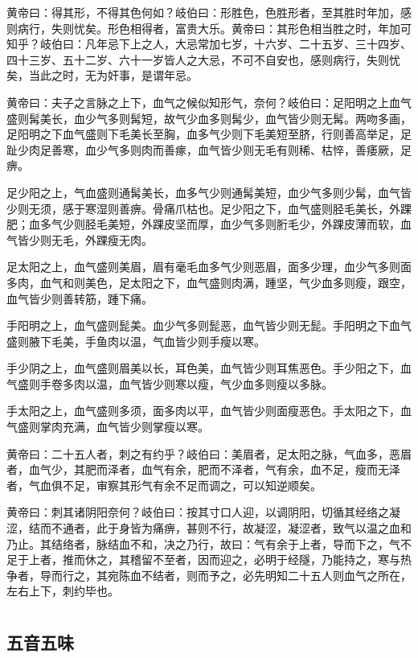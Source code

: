 \documentclass[a4paper,12pt,UTF8,twoside]{ctexbook}
\begin{document}
	黄帝曰：得其形，不得其色何如？岐伯曰：形胜色，色胜形者，至其胜时年加，感则病行，失则忧矣。形色相得者，富贵大乐。黄帝曰：其形色相当胜之时，年加可知乎？岐伯曰：凡年忌下上之人，大忌常加七岁，十六岁、二十五岁、三十四岁、四十三岁、五十二岁、六十一岁皆人之大忌，不可不自安也，感则病行，失则忧矣，当此之时，无为奸事，是谓年忌。
	
	黄帝曰：夫子之言脉之上下，血气之候似知形气，奈何？岐伯曰：足阳明之上血气盛则髯美长，血少气多则髯短，故气少血多则髯少，血气皆少则无髯。两吻多画，足阳明之下血气盛则下毛美长至胸，血多气少则下毛美短至脐，行则善高举足，足趾少肉足善寒，血少气多则肉而善瘃，血气皆少则无毛有则稀、枯悴，善痿厥，足痹。
	
	足少阳之上，气血盛则通髯美长，血多气少则通髯美短，血少气多则少髯，血气皆少则无须，感于寒湿则善痹。骨痛爪枯也。足少阳之下，血气盛则胫毛美长，外踝肥；血多气少则胫毛美短，外踝皮坚而厚，血少气多则胻毛少，外踝皮薄而软，血气皆少则无毛，外踝瘦无肉。
	
	足太阳之上，血气盛则美眉，眉有毫毛血多气少则恶眉，面多少理，血少气多则面多肉，血气和则美色，足太阳之下，血气盛则肉满，踵坚，气少血多则瘦，跟空，血气皆少则善转筋，踵下痛。
	
	手阳明之上，血气盛则髭美。血少气多则髭恶，血气皆少则无髭。手阳明之下血气盛则腋下毛美，手鱼肉以温，气血皆少则手瘦以寒。
	
	手少阴之上，血气盛则眉美以长，耳色美，血气皆少则耳焦恶色。手少阳之下，血气盛则手卷多肉以温，血气皆少则寒以瘦，气少血多则瘦以多脉。
	
	手太阳之上，血气盛则多须，面多肉以平，血气皆少则面瘦恶色。手太阳之下，血气盛则掌肉充满，血气皆少则掌瘦以寒。
	
	黄帝曰：二十五人者，刺之有约乎？岐伯曰：美眉者，足太阳之脉，气血多，恶眉者，血气少，其肥而泽者，血气有余，肥而不泽者，气有余，血不足，瘦而无泽者，气血俱不足，审察其形气有余不足而调之，可以知逆顺矣。
	
	黄帝曰：刺其诸阴阳奈何？岐伯曰：按其寸口人迎，以调阴阳，切循其经络之凝涩，结而不通者，此于身皆为痛痹，甚则不行，故凝涩，凝涩者，致气以温之血和乃止。其结络者，脉结血不和，决之乃行，故曰：气有余于上者，导而下之，气不足于上者，推而休之，其稽留不至者，因而迎之，必明于经隧，乃能持之，寒与热争者，导而行之，其宛陈血不结者，则而予之，必先明知二十五人则血气之所在，左右上下，刺约毕也。
	
	\part{}
	\chapter{五音五味}
	
\end{document}
